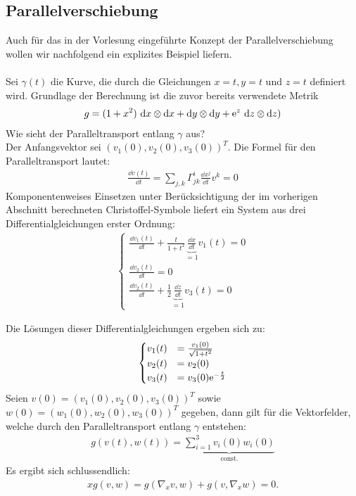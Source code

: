 \subsection{Parallelverschiebung}
Auch für das in der Vorlesung eingeführte Konzept der Parallelverschiebung wollen wir nachfolgend ein explizites Beispiel liefern. \\
\phantom{.}\\
Sei $\gamma(t)$ die Kurve, die durch die Gleichungen $x = t, y = t$ und $z = t$  definiert wird. Grundlage der Berechnung ist die zuvor bereits verwendete Metrik
\begin{align*}
g= (1+x^2)\ \dd x\otimes \dd x + \dd y \otimes \dd y + \mathrm{e}^z \ \dd z \otimes \dd z)
\end{align*} 
Wie sieht der Paralleltransport entlang $\gamma$ aus? \\

Der Anfangsvektor sei $\left(v_1(0), v_2(0), v_3(0) \right)^T$. Die Formel für den Paralleltransport lautet: 
\begin{align*}
\frac{\dd v(t)}{\dd t} = \sum_{j, k} \Gamma_{jk}^i \frac{\dd x^j}{\dd t} v^k =0
\end{align*}
Komponentenweises Einsetzen unter Berücksichtigung der im vorherigen Abschnitt berechneten Christoffel-Symbole liefert ein System aus drei Differentialgleichungen erster Ordnung:
\begin{align*}
\begin{cases}
\frac{\dd v_1(t)}{\dd t} + \frac{t}{1+t^2}\underbrace{\frac{\dd x}{\dd t}}_{= 1} v_1(t) = 0 \\
\frac{\dd v_2(t)}{\dd t} = 0 \\
\frac{\dd v_2(t)}{\dd t} + \frac{1}{2} \underbrace{\frac{\dd z}{\dd t}}_{= 1} v_3(t)= 0 
\end{cases}
\end{align*}

Die Lösungen dieser Differentialgleichungen ergeben sich zu:
\begin{align*}
	\begin{cases}
		v_1(t) &= \frac{v_1(0)}{\sqrt{1+t^2}}\\
	v_2(t) &= v_2(0) \\
	 v_3(t)& = v_3(0)\mathrm{e}^{-\frac{t}{2}}
	\end{cases}
\end{align*}
Seien $v(0) = \left(v_1(0), v_2(0), v_3(0) \right)^T$ sowie $w(0) = \left(w_1(0), w_2(0), w_3(0) \right)^T$ gegeben, dann gilt für die Vektorfelder, welche durch den Paralleltransport entlang $\gamma$ entstehen:
\begin{align*}
g(v(t),w(t)) = \underbrace{\sum_{i=1}^{3} v_i(0)w_i(0)}_{\text{const.}}
\end{align*}
Es ergibt sich schlussendlich:
\begin{align*}
x g(v,w) = g(\nabla_xv,w) + g(v,\nabla_xw) = 0.
\end{align*}

